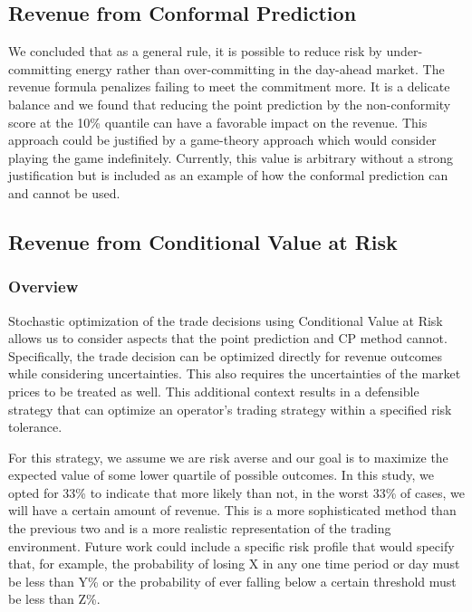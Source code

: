 \documentclass[
  journal,
]{IEEEtran}%
\begin{document}
\subsection{Revenue from Conformal
Prediction}\label{revenue-from-conformal-prediction}

We concluded that as a general rule, it is possible to reduce risk by
under-committing energy rather than over-committing in the day-ahead
market. The revenue formula penalizes failing to meet the commitment
more. It is a delicate balance and we found that reducing the point
prediction by the non-conformity score at the 10\% quantile can have a
favorable impact on the revenue. This approach could be justified by a
game-theory approach which would consider playing the game indefinitely.
Currently, this value is arbitrary without a strong justification but is
included as an example of how the conformal prediction can and cannot be
used.

\subsection{Revenue from Conditional Value at
Risk}\label{revenue-from-conditional-value-at-risk}

\subsubsection{Overview}\label{overview}

Stochastic optimization of the trade decisions using Conditional Value
at Risk allows us to consider aspects that the point prediction and CP
method cannot. Specifically, the trade decision can be optimized
directly for revenue outcomes while considering uncertainties. This also
requires the uncertainties of the market prices to be treated as well.
This additional context results in a defensible strategy that can
optimize an operator's trading strategy within a specified risk
tolerance.

For this strategy, we assume we are risk averse and our goal is to
maximize the expected value of some lower quartile of possible outcomes.
In this study, we opted for 33\% to indicate that more likely than not,
in the worst 33\% of cases, we will have a certain amount of revenue.
This is a more sophisticated method than the previous two and is a more
realistic representation of the trading environment. Future work could
include a specific risk profile that would specify that, for example,
the probability of losing X in any one time period or day must be less
than Y\% or the probability of ever falling below a certain threshold
must be less than Z\%.
\end{document}
